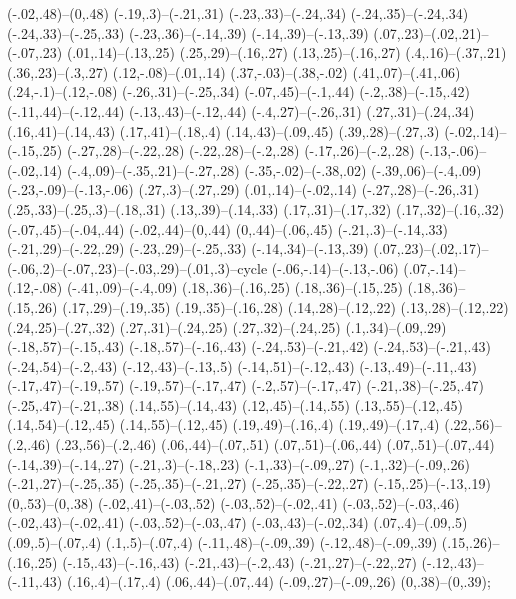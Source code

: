 {(-.02,.48)--(0,.48) (-.19,.3)--(-.21,.31) (-.23,.33)--(-.24,.34) (-.24,.35)--(-.24,.34) (-.24,.33)--(-.25,.33) (-.23,.36)--(-.14,.39) (-.14,.39)--(-.13,.39) (.07,.23)--(.02,.21)--(-.07,.23) (.01,.14)--(.13,.25) (.25,.29)--(.16,.27) (.13,.25)--(.16,.27) (.4,.16)--(.37,.21) (.36,.23)--(.3,.27) (.12,-.08)--(.01,.14) (.37,-.03)--(.38,-.02) (.41,.07)--(.41,.06) (.24,-.1)--(.12,-.08) (-.26,.31)--(-.25,.34) (-.07,.45)--(-.1,.44) (-.2,.38)--(-.15,.42) (-.11,.44)--(-.12,.44) (-.13,.43)--(-.12,.44) (-.4,.27)--(-.26,.31) (.27,.31)--(.24,.34) (.16,.41)--(.14,.43) (.17,.41)--(.18,.4) (.14,.43)--(.09,.45) (.39,.28)--(.27,.3) (-.02,.14)--(-.15,.25) (-.27,.28)--(-.22,.28) (-.22,.28)--(-.2,.28) (-.17,.26)--(-.2,.28) (-.13,-.06)--(-.02,.14) (-.4,.09)--(-.35,.21)--(-.27,.28) (-.35,-.02)--(-.38,.02) (-.39,.06)--(-.4,.09) (-.23,-.09)--(-.13,-.06) (.27,.3)--(.27,.29) (.01,.14)--(-.02,.14) (-.27,.28)--(-.26,.31) (.25,.33)--(.25,.3)--(.18,.31) (.13,.39)--(.14,.33) (.17,.31)--(.17,.32) (.17,.32)--(.16,.32) (-.07,.45)--(-.04,.44) (-.02,.44)--(0,.44) (0,.44)--(.06,.45) (-.21,.3)--(-.14,.33) (-.21,.29)--(-.22,.29) (-.23,.29)--(-.25,.33) (-.14,.34)--(-.13,.39) (.07,.23)--(.02,.17)--(-.06,.2)--(-.07,.23)--(-.03,.29)--(.01,.3)--cycle (-.06,-.14)--(-.13,-.06) (.07,-.14)--(.12,-.08) (-.41,.09)--(-.4,.09) (.18,.36)--(.16,.25) (.18,.36)--(.15,.25) (.18,.36)--(.15,.26) (.17,.29)--(.19,.35) (.19,.35)--(.16,.28) (.14,.28)--(.12,.22) (.13,.28)--(.12,.22) (.24,.25)--(.27,.32) (.27,.31)--(.24,.25) (.27,.32)--(.24,.25) (.1,.34)--(.09,.29) (-.18,.57)--(-.15,.43) (-.18,.57)--(-.16,.43) (-.24,.53)--(-.21,.42) (-.24,.53)--(-.21,.43) (-.24,.54)--(-.2,.43) (-.12,.43)--(-.13,.5) (-.14,.51)--(-.12,.43) (-.13,.49)--(-.11,.43) (-.17,.47)--(-.19,.57) (-.19,.57)--(-.17,.47) (-.2,.57)--(-.17,.47) (-.21,.38)--(-.25,.47) (-.25,.47)--(-.21,.38) (.14,.55)--(.14,.43) (.12,.45)--(.14,.55) (.13,.55)--(.12,.45) (.14,.54)--(.12,.45) (.14,.55)--(.12,.45) (.19,.49)--(.16,.4) (.19,.49)--(.17,.4) (.22,.56)--(.2,.46) (.23,.56)--(.2,.46) (.06,.44)--(.07,.51) (.07,.51)--(.06,.44) (.07,.51)--(.07,.44) (-.14,.39)--(-.14,.27) (-.21,.3)--(-.18,.23) (-.1,.33)--(-.09,.27) (-.1,.32)--(-.09,.26) (-.21,.27)--(-.25,.35) (-.25,.35)--(-.21,.27) (-.25,.35)--(-.22,.27) (-.15,.25)--(-.13,.19) (0,.53)--(0,.38) (-.02,.41)--(-.03,.52) (-.03,.52)--(-.02,.41) (-.03,.52)--(-.03,.46) (-.02,.43)--(-.02,.41) (-.03,.52)--(-.03,.47) (-.03,.43)--(-.02,.34) (.07,.4)--(.09,.5) (.09,.5)--(.07,.4) (.1,.5)--(.07,.4) (-.11,.48)--(-.09,.39) (-.12,.48)--(-.09,.39) (.15,.26)--(.16,.25) (-.15,.43)--(-.16,.43) (-.21,.43)--(-.2,.43) (-.21,.27)--(-.22,.27) (-.12,.43)--(-.11,.43) (.16,.4)--(.17,.4) (.06,.44)--(.07,.44) (-.09,.27)--(-.09,.26) (0,.38)--(0,.39);}
